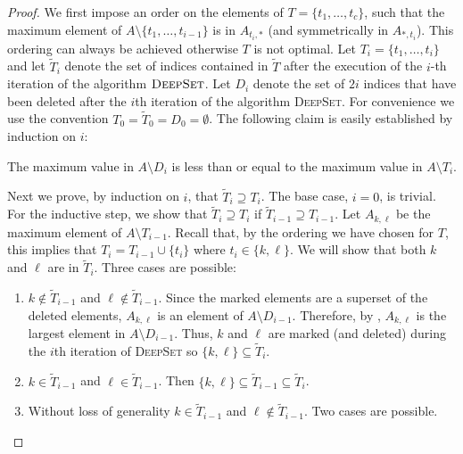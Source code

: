 \documentclass[lotsofwhite]{patmorin}
\begin{document}
\begin{proof}
We first impose an order on the elements of $T=\{t_1,\ldots,t_c\}$,
such that the maximum element of $A \setminus \{t_1,\ldots,t_{i-1}\}$
is in $A_{t_{i},*}$ (and symmetrically in
$A_{*,t_{i}}$).  This ordering can always be achieved otherwise $T$ is
not optimal.  Let $T_i = \{t_1,\ldots,t_i\}$ and let $\tilde{T}_i$
denote the set of indices contained in $\tilde{T}$ after the execution
of the $i$-th iteration of the algorithm $\textsc{DeepSet}$.  Let
$D_i$ denote the set of $2i$ indices that have been deleted after the
$i$th iteration of the algorithm \textsc{DeepSet}.  For convenience we
use the convention $T_0=\tilde{T}_0=D_0=\emptyset$.  The following
claim is easily established by induction on $i$:

\begin{clm}
The maximum value in $A\setminus D_i$ is less than or equal to the
maximum value in $A\setminus T_i$.
\end{clm}

Next we prove, by induction on $i$, that $\tilde{T}_{i}\supseteq T_i$.
The base case, $i=0$, is trivial.  For the inductive step, we show
that $\tilde{T}_i \supseteq T_i$ if $\tilde{T}_{i-1} \supseteq
T_{i-1}$.  Let $A_{k,\ell}$ be the maximum element of $A \setminus
T_{i-1}$.  Recall that, by the ordering we have chosen for $T$, this
implies that $T_i=T_{i-1}\cup\{t_i\}$ where $t_i\in\{k,\ell\}$.  We
will show that both $k$ and $\ell$ are in $\tilde{T}_i$. Three cases
are possible: 

\begin{enumerate}

\item $k \not \in \tilde{T}_{i-1}$ and $\ell \not \in
\tilde{T}_{i-1}$.  Since the marked elements are a superset of the
deleted elements, $A_{k,\ell}$ is an element of $A \setminus D_{i-1}$.
Therefore, by , $A_{k,\ell}$ is the largest
element in $A\setminus D_{i-1}$.  Thus, $k$ and $\ell$ are marked (and
deleted) during the $i$th iteration of \textsc{DeepSet} so
$\{k,\ell\}\subseteq\tilde{T}_i$. 

\item $k \in \tilde{T}_{i-1}$ and $\ell \in \tilde{T}_{i-1}$.  Then
$\{k,\ell\}\subseteq \tilde{T}_{i-1}\subseteq \tilde{T}_i$.

\item Without loss of generality $k \in \tilde{T}_{i-1}$ and $\ell \not
\in \tilde{T}_{i-1}$. Two cases are possible.


\end{enumerate}
\end{proof}
\end{document}
